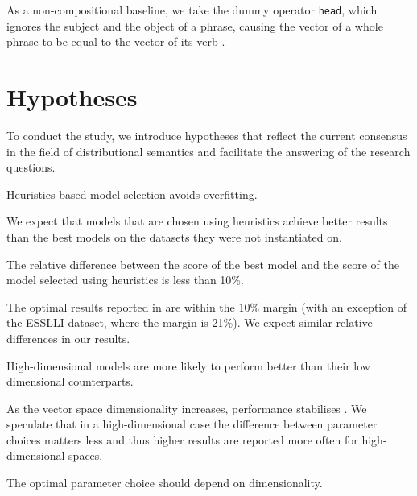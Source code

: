 As a non-compositional baseline, we take the dummy operator \texttt{head}, which ignores the subject and the object of a phrase, causing the vector of a whole phrase to be equal to the vector of its verb \cite{milajevs-EtAl:2014:EMNLP2014}.

\section{Hypotheses}
\label{sec:hypotheses}

To conduct the study, we introduce hypotheses that reflect the current consensus in the field of distributional semantics and facilitate the answering of the research questions.

\begin{hyp}
\label{hyp:overfitting}
Heuristics-based model selection avoids overfitting.
\end{hyp}

We expect that models that are chosen using heuristics achieve better results than the best models on the datasets they were not instantiated on.

\begin{hyp}
\label{hyp:10percent}
The relative difference between the score of the best model and the score of the model selected using heuristics is less than 10\%.
\end{hyp}

The optimal results reported in  are within the 10\% margin (with an exception of the ESSLLI dataset, where the margin is 21\%). We expect similar relative differences in our results.

\begin{hyp}
\label{hyp:var}
High-dimensional models are more likely to perform better than their low dimensional counterparts.
\end{hyp}

As the vector space dimensionality increases, performance stabilises \cite{kiela-clark:2014:CVSC,BullinariaLevy2012,lapesa2014large}. We speculate that in a high-dimensional case the difference between parameter choices matters less and thus higher results are reported more often for high-dimensional spaces.

\begin{hyp}
\label{hyp:dimen}
The optimal parameter choice should depend on dimensionality.
\end{hyp}

